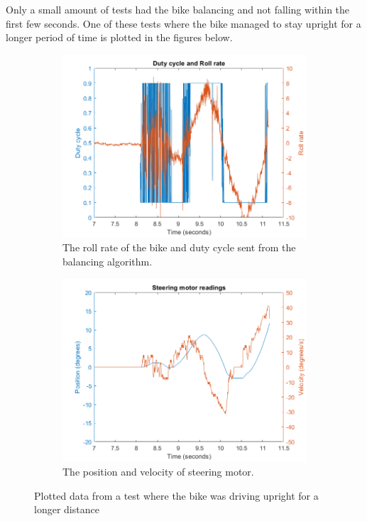 Only a small amount of tests had the bike balancing and not falling within the first few seconds. One of these tests where the bike managed to stay upright for a longer period of time is plotted in the figures below.

\begin{figure}[H]
    \begin{subfigure}{.5\textwidth}
        \centering
        \includegraphics[width=\textwidth]{include/test4_control.png}
        \caption{The roll rate of the bike and duty cycle sent from the balancing algorithm.}
        \label{fig:test4_control}
    \end{subfigure}
    \begin{subfigure}{.5\textwidth}
        \centering
        \includegraphics[width=\textwidth]{include/test4_motor.png}
        \caption{The position and velocity of steering motor.}
        \label{fig:test4_motor}
    \end{subfigure}
\caption{Plotted data from a test where the bike was driving upright for a longer distance}
\label{fig:test4}
\end{figure}

